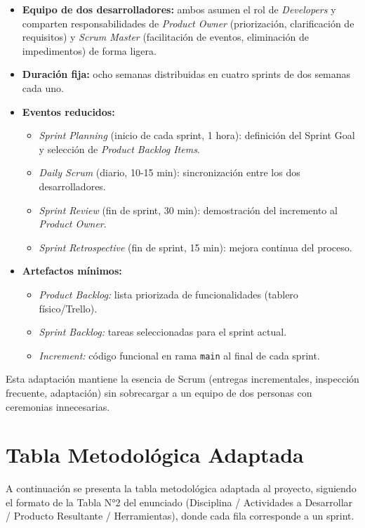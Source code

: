 \documentclass[12pt, letterpaper, oneside]{report}
\begin{document}
\begin{itemize}
  \item \textbf{Equipo de dos desarrolladores:} ambos asumen el rol de \textit{Developers} y comparten responsabilidades de \textit{Product Owner} (priorizaci\'on, clarificaci\'on de requisitos) y \textit{Scrum Master} (facilitaci\'on de eventos, eliminaci\'on de impedimentos) de forma ligera.
  \item \textbf{Duraci\'on fija:} ocho semanas distribuidas en cuatro sprints de dos semanas cada uno.
  \item \textbf{Eventos reducidos:}
    \begin{itemize}
      \item \textit{Sprint Planning} (inicio de cada sprint, 1 hora): definici\'on del Sprint Goal y selecci\'on de \textit{Product Backlog Items}.
      \item \textit{Daily Scrum} (diario, 10-15 min): sincronizaci\'on entre los dos desarrolladores.
      \item \textit{Sprint Review} (fin de sprint, 30 min): demostraci\'on del incremento al \textit{Product Owner}.
      \item \textit{Sprint Retrospective} (fin de sprint, 15 min): mejora continua del proceso.
    \end{itemize}
  \item \textbf{Artefactos m\'inimos:}
    \begin{itemize}
      \item \textit{Product Backlog:} lista priorizada de funcionalidades (tablero f\'isico/Trello).
      \item \textit{Sprint Backlog:} tareas seleccionadas para el sprint actual.
      \item \textit{Increment:} c\'odigo funcional en rama \texttt{main} al final de cada sprint.
    \end{itemize}
\end{itemize}

Esta adaptaci\'on mantiene la esencia de Scrum (entregas incrementales, inspecci\'on frecuente, adaptaci\'on) sin sobrecargar a un equipo de dos personas con ceremonias innecesarias.

\section{Tabla Metodol\'ogica Adaptada}

A continuaci\'on se presenta la tabla metodol\'ogica adaptada al proyecto, siguiendo el formato de la Tabla N°2 del enunciado (Disciplina / Actividades a Desarrollar / Producto Resultante / Herramientas), donde cada fila corresponde a un sprint.
\end{document}
